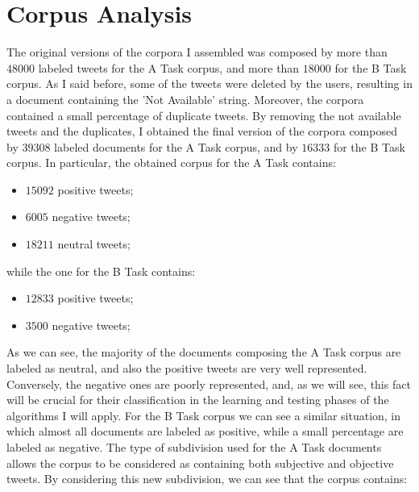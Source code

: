 \documentclass[11pt,twocolumn]{article}
\begin{document}
    \section{Corpus Analysis} %
    \label{sec:corpus_analysis}
        The original versions of the corpora I assembled was composed by more than $48000$ labeled tweets for the
        A Task corpus, and more than $18000$ for the B Task corpus. As I said before, some of the tweets were
        deleted by the users, resulting in a document containing the 'Not Available' string. Moreover, the
        corpora contained a small percentage of duplicate tweets. By removing the not available tweets and the
        duplicates, I obtained the final version of the corpora composed by $39308$ labeled documents for the
        A Task corpus, and by $16333$ for the B Task corpus. In particular, the obtained corpus for the A Task
        contains:

        \begin{itemize}
            \item $15092$ positive tweets;
            \item $6005$ negative tweets;
            \item $18211$ neutral tweets;
        \end{itemize}

        while the one for the B Task contains:

        \begin{itemize}
            \item $12833$ positive tweets;
            \item $3500$ negative tweets;
        \end{itemize}

        \noindent
        As we can see, the majority of the documents composing the A Task corpus are labeled as neutral, and also
        the positive tweets are very well represented. Conversely, the negative ones are poorly
        represented, and, as we will see, this fact will be crucial for their classification in the
        learning and testing phases of the algorithms I will apply. For the B Task corpus we can see a similar
        situation, in which almost all documents are labeled as positive, while a small percentage are labeled as
        negative. The type of subdivision used for the A Task documents allows the corpus to be considered as
        containing both subjective and objective tweets. By considering this new subdivision, we can see that the
        corpus contains:
\end{document}
